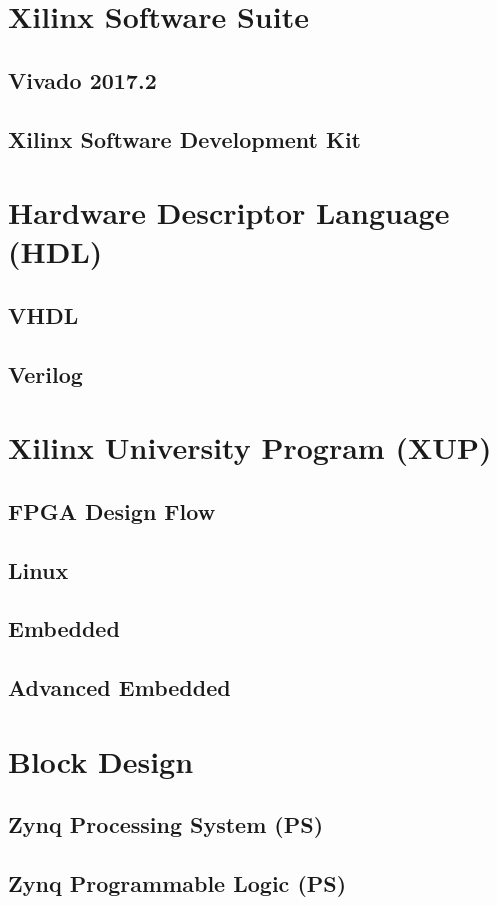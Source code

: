 \section{Xilinx Software Suite}
\subsection{Vivado 2017.2}
\subsection{Xilinx Software Development Kit}
\section{Hardware Descriptor Language (HDL)}
\subsection{VHDL}
\subsection{Verilog}
\section{Xilinx University Program (XUP)}
\subsection{FPGA Design Flow}
\subsection{Linux}
\subsection{Embedded}
\subsection{Advanced Embedded}
\section{Block Design}
\subsection{Zynq Processing System (PS)}
\subsection{Zynq Programmable Logic (PS)}
